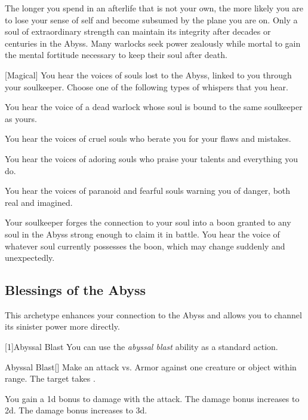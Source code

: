         The longer you spend in an afterlife that is not your own, the more likely you are to lose your sense of self and become subsumed by the plane you are on.
        Only a soul of extraordinary strength can maintain its integrity after decades or centuries in the Abyss.
        Many warlocks seek power zealously while mortal to gain the mental fortitude necessary to keep their soul after death.

        [Magical]
        You hear the voices of souls lost to the Abyss, linked to you through your soulkeeper.
        Choose one of the following types of whispers that you hear.
        {
             You hear the voice of a dead warlock whose soul is bound to the same soulkeeper as yours.

             You hear the voices of cruel souls who berate you for your flaws and mistakes.

             You hear the voices of adoring souls who praise your talents and everything you do.

             You hear the voices of paranoid and fearful souls warning you of danger, both real and imagined.

             Your soulkeeper forges the connection to your soul into a boon granted to any soul in the Abyss strong enough to claim it in battle.
            You hear the voice of whatever soul currently possesses the boon, which may change suddenly and unexpectedly.
        }

    \subsection{Blessings of the Abyss}
        This archetype enhances your connection to the Abyss and allows you to channel its sinister power more directly.

        [1]{Abyssal Blast} You can use the \textit{abyssal blast} ability as a standard action.
        \begin{freeability}{Abyssal Blast}[]
            Make an attack vs. Armor against one creature or object within \rngclose range.
            \hit The target takes .

            \rankline
             You gain a \plus1d bonus to damage with the attack.
             The damage bonus increases to \plus2d.
             The damage bonus increases to \plus3d.
        \end{freeability}

